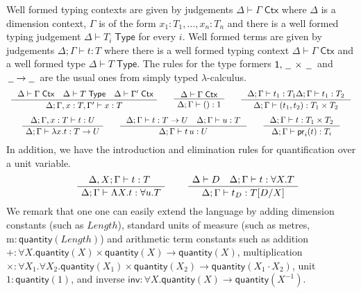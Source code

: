 \documentclass[a4paper,UKenglish]{lipics}
\newcommand{\ra}{\rightarrow}
\newcommand{\msf}[1]{\mathsf{#1}} %
\newcommand{\blank}{\, \underline{\hspace{2mm}} \,}
\newcommand{\num}{\msf{quantity}}
\newcommand{\length}{\mathit{Length}}
\newcommand{\cj}[2]{#1 \vdash #2 \; \msf{ Ctx}}
\newcommand{\Tj}[2]{#1 \vdash #2 \; \msf{ Type}}
\newcommand{\tj}[4]{#1;#2 \vdash #3 : #4}
\newcommand{\proj}{\mathsf{pr}}
\newcommand{\pack}[2]{\mathsf{pack}(#1,#2)}
\newcommand{\unpack}[4]{\mathsf{unpack}\,#1\,\mathsf{as}\,(#2,#3)\,\mathsf{in}\,#4}
\newcommand{\Dim}{D}
\newcommand{\Dvar}{X}
\begin{document}
Well formed typing contexts are given by judgements
$\cj\Delta\Gamma $ where $\Delta$ is a dimension context, $\Gamma$ is
of the form ${x_1 : T_1, \ldots, x_n:T_n}$ and there is a well formed
typing judgement $\Tj\Delta{ T_i}$ for every $i$. Well formed terms
are given by judgements $\tj \Delta \Gamma t T$ where there is a
well formed typing context $\cj \Delta \Gamma$ and
a well formed type $\Tj \Delta T $. The rules for
the type formers $\msf{1}, \blank\times\blank$ and $\blank \! \ra \! \blank$ are the usual ones from
simply typed $\lambda$-calculus.
\[\begin{array}{c}
\AxiomC{
$\cj \Delta\Gamma\quad
\Tj\Delta T\quad
\cj\Delta {\Gamma'}$}
\UnaryInfC
{$\tj \Delta{\Gamma,x:T,\Gamma'}xT$}
\DisplayProof
\qquad
\AxiomC{
$\cj\Delta {\Gamma}
$
}
\UnaryInfC
{$\tj \Delta{\Gamma}{()}1$}
\DisplayProof
\qquad
\AxiomC{
$
\tj\Delta {\Gamma} {t_1}{T_1}
\tj\Delta {\Gamma} {t_1}{T_2}
$
}
\UnaryInfC
{$\tj \Delta{\Gamma}{(t_1,t_2)}{T_1\times T_2}$}
\DisplayProof
\\[5mm]
\AxiomC{
$
\tj\Delta {\Gamma,x:T} {t}{U}
$
}
\UnaryInfC
{$\tj\Delta {\Gamma} {\lambda x.t}{T\to U}$}
\DisplayProof
\qquad
\AxiomC{
$
\tj\Delta {\Gamma} {t}{T\to U}\quad
\tj\Delta {\Gamma} {u}{T}
$
}
\UnaryInfC
{$\tj \Delta{\Gamma}{t\,u}U$}
\DisplayProof
\qquad
\AxiomC{
$
\tj\Delta {\Gamma} {t}{T_1\times T_2}
$
}
\UnaryInfC
{$\tj\Delta {\Gamma} {\proj_i(t)}{T_i}$}
\DisplayProof
\end{array}\]
In addition, we have the introduction and elimination rules for quantification over a unit variable.
\[\begin{array}{cc}
\hspace{5mm}
\AxiomC{$\tj{\Delta,\Dvar}\Gamma tT$ }
		\UnaryInfC{$\tj \Delta  \Gamma {\Lambda \Dvar.t} {\forall u.T}$}
		\DisplayProof

&\hspace{5mm}
\AxiomC{$\Delta \vdash \Dim \quad \tj \Delta \Gamma  t{\forall \Dvar.T}$}
	\UnaryInfC{$\tj \Delta  \Gamma {t_\Dim}{T[\Dim/\Dvar]}$}
	\DisplayProof
%
\end{array}\]
We remark that one
one can easily extend the language by adding
dimension constants (such as $\length$),
standard units of measure (such as metres, $\mathrm{m}:\num(\length)$)
and
arithmetic term constants
such as addition
$+:\forall \Dvar. \num(\Dvar)\times  \num(\Dvar) \rightarrow \num(\Dvar)$,
multiplication $\times :\forall \Dvar_1. \forall \Dvar_2. \num(\Dvar_1)\times \num(\Dvar_2) \rightarrow \num(\Dvar_1 \cdot \Dvar_2)$,
unit $1:\num(1)$,
and inverse $\mathsf{inv}:\forall \Dvar.\num(\Dvar)\to \num (\Dvar^{-1})$.
\end{document}
